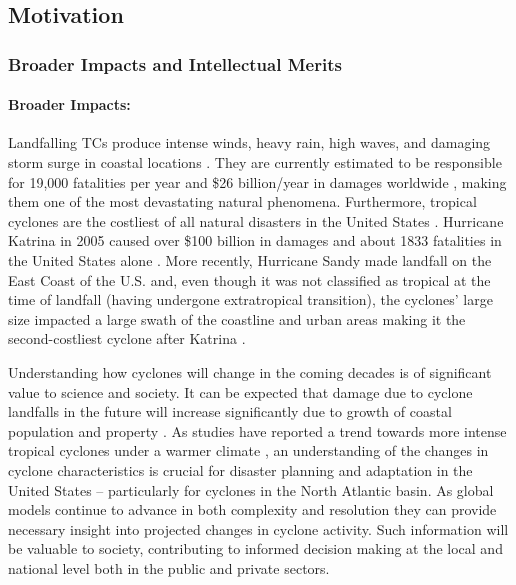 \documentclass[11pt]{article}
\begin{document}
\subsection{Motivation} \label{sec:Motivation}

\subsubsection{Broader Impacts and Intellectual Merits}

\paragraph{Broader Impacts:}  

Landfalling TCs produce intense winds, heavy rain, high waves, and damaging storm surge in coastal locations \citep{EmanuelDivineWind}. They are currently estimated to be responsible for 19,000 fatalities per year and \$26 billion/year in damages worldwide \citep{Mendelsohn2012}, making them one of the most devastating natural phenomena. Furthermore, tropical cyclones are the costliest of all natural disasters in the United States \citep{Pielke1998}. Hurricane Katrina in 2005 caused over \$100 billion in damages and about 1833 fatalities in the United States alone \citep{Blake2011}. More recently, Hurricane Sandy made landfall on the East Coast of the U.S. and, even though it was not classified as tropical at the time of landfall (having undergone extratropical transition), the cyclones' large size impacted a large swath of the coastline and urban areas making it the second-costliest cyclone after Katrina \citep{Blake2013}.  

Understanding how cyclones will change in the coming decades is of significant value to science and society. It can be expected that damage due to cyclone landfalls in the future will increase significantly due to growth of coastal population and property \citep{Pielke2008}. As studies have reported a trend towards more intense tropical cyclones under a warmer climate \citep{Knutson2010}, an understanding of the changes in cyclone characteristics is crucial for disaster planning and adaptation in the United States -- particularly for cyclones in the  North Atlantic basin. As global models continue to advance in both complexity and resolution they can provide necessary insight into projected changes in cyclone activity.  Such information will be valuable to society, contributing to informed decision making at the local and national level both in the public and private sectors.
\end{document}
